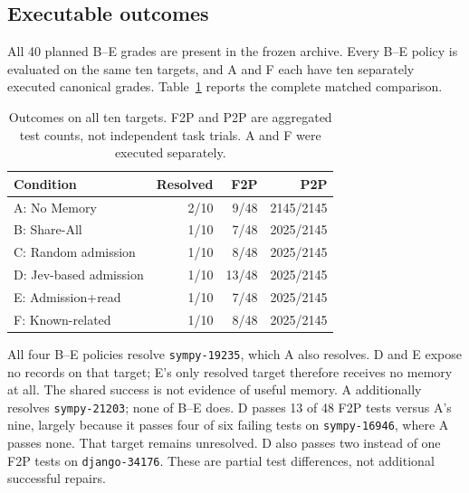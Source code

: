 \documentclass[sigconf,anonymous]{aamas}
\begin{document}
\subsection{Executable outcomes}
All 40 planned B--E grades are present in the frozen archive. Every B--E policy is evaluated on the same ten targets, and A and F each have ten separately executed canonical grades. Table~\ref{tab:aggregate} reports the complete matched comparison.

\begin{table}[t]
\caption{Outcomes on all ten targets. F2P and P2P are aggregated test counts, not independent task trials. A and F were executed separately.}
\label{tab:aggregate}
\centering
\begin{tabular}{lrrr}
\toprule
Condition & Resolved & F2P & P2P \\
\midrule
A: No Memory & 2/10 & 9/48 & 2145/2145\\
B: Share-All & 1/10 & 7/48 & 2025/2145\\
C: Random admission & 1/10 & 8/48 & 2025/2145\\
D: Jev-based admission & 1/10 & 13/48 & 2025/2145\\
E: Admission+read & 1/10 & 7/48 & 2025/2145\\
F: Known-related & 1/10 & 8/48 & 2025/2145\\
\bottomrule
\end{tabular}
\end{table}

All four B--E policies resolve \texttt{sympy-19235}, which A also resolves. D and E expose no records on that target; E's only resolved target therefore receives no memory at all. The shared success is not evidence of useful memory. A additionally resolves \texttt{sympy-21203}; none of B--E does. D passes 13 of 48 F2P tests versus A's nine, largely because it passes four of six failing tests on \texttt{sympy-16946}, where A passes none. That target remains unresolved. D also passes two instead of one F2P tests on \texttt{django-34176}. These are partial test differences, not additional successful repairs.
\end{document}
